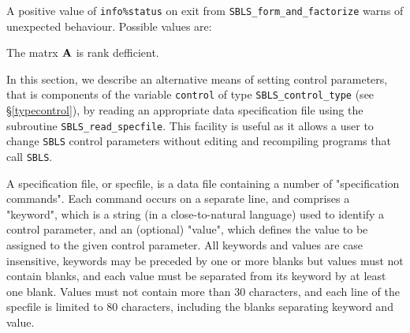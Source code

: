 \documentclass{galahad}
\newcommand{\packagename}{SBLS}
\begin{document}
A positive value of {\tt info\%status} on exit from
{\tt \packagename\_form\_and\_factorize} warns of unexpected behaviour.
Possible values are:

\begin{description}

 The matrx ${\mathbf{A}}$ is rank defficient.

\end{description}


\galfeatures
\noindent In this section, we describe an alternative means of setting
control parameters, that is components of the variable {\tt control} of type
{\tt \packagename\_control\_type}
(see \S\ref{typecontrol}),
by reading an appropriate data specification file using the
subroutine {\tt \packagename\_read\_specfile}. This facility
is useful as it allows a user to change  {\tt \packagename} control parameters
without editing and recompiling programs that call {\tt \packagename}.

A specification file, or specfile, is a data file containing a number of
"specification commands". Each command occurs on a separate line,
and comprises a "keyword",
which is a string (in a close-to-natural language) used to identify a
control parameter, and
an (optional) "value", which defines the value to be assigned to the given
control parameter. All keywords and values are case insensitive,
keywords may be preceded by one or more blanks but
values must not contain blanks, and
each value must be separated from its keyword by at least one blank.
Values must not contain more than 30 characters, and
each line of the specfile is limited to 80 characters,
including the blanks separating keyword and value.
\end{document}
